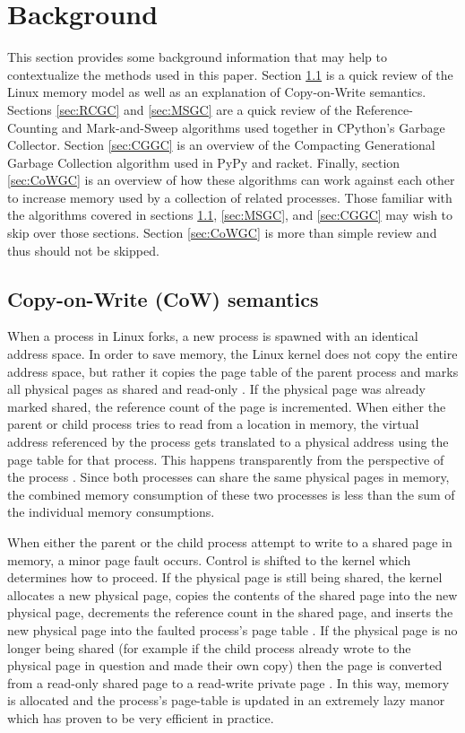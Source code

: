\documentclass{article}
\begin{document}
\section{Background}

This section provides some background information that may help to contextualize the methods used in this paper.  Section \ref{sec:CoW} is a quick review of the Linux memory model as well as an explanation of Copy-on-Write semantics.  Sections \ref{sec:RCGC} and \ref{sec:MSGC} are a quick review of the Reference-Counting and Mark-and-Sweep algorithms used together in CPython's Garbage Collector.  Section \ref{sec:CGGC} is an overview of the Compacting Generational Garbage Collection algorithm used in PyPy and racket.  Finally, section \ref{sec:CoWGC} is an overview of how these algorithms can work against each other to increase memory used by a collection of related processes.  Those familiar with the algorithms covered in sections \ref{sec:CoW}, \ref{sec:MSGC}, and \ref{sec:CGGC} may wish to skip over those sections.  Section \ref{sec:CoWGC} is more than simple review and thus should not be skipped.  

\subsection{Copy-on-Write (CoW) semantics}\label{sec:CoW}

When a process in Linux forks, a new process is spawned with an identical address space.  In order to save memory, the Linux kernel does not copy the entire address space, but rather it copies the page table of the parent process and marks all physical pages as shared and read-only \cite{VMM}.  If the physical page was already marked shared, the reference count of the page is incremented.  When either the parent or child process tries to read from a location in memory, the virtual address referenced by the process gets translated to a physical address using the page table for that process.  This happens transparently from the perspective of the process \cite{VMM}.  Since both processes can share the same physical pages in memory, the combined memory consumption of these two processes is less than the sum of the individual memory consumptions.

When either the parent or the child process attempt to write to a shared page in memory, a minor page fault occurs.  Control is shifted to the kernel which determines how to proceed.  If the physical page is still being shared, the kernel allocates a new physical page, copies the contents of the shared page into the new physical page, decrements the reference count in the shared page, and inserts the new physical page into the faulted process's page table \cite{VMM}.  If the physical page is no longer being shared (for example if the child process already wrote to the physical page in question and made their own copy) then the page is converted from a read-only shared page to a read-write private page \cite{VMM}.  In this way, memory is allocated and the process's page-table is updated in an extremely lazy manor which has proven to be very efficient in practice.  
\end{document}
